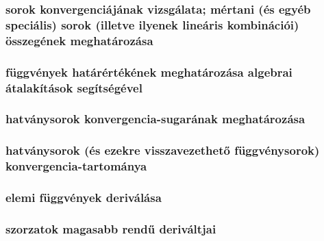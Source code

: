 \documentclass[12pt]{article}
\begin{document}
\subsubsection{sorok konvergenciájának vizsgálata; mértani (és egyéb speciális) sorok (illetve
ilyenek lineáris kombinációi) összegének meghatározása}
\subsubsection{függvények határértékének meghatározása algebrai átalakítások segítségével}
\subsubsection{hatványsorok konvergencia-sugarának meghatározása}
\subsubsection{hatványsorok (és ezekre
visszavezethető függvénysorok) konvergencia-tartománya}
\subsubsection{elemi függvények deriválása}
\subsubsection{szorzatok magasabb rendű deriváltjai}
\end{document}
